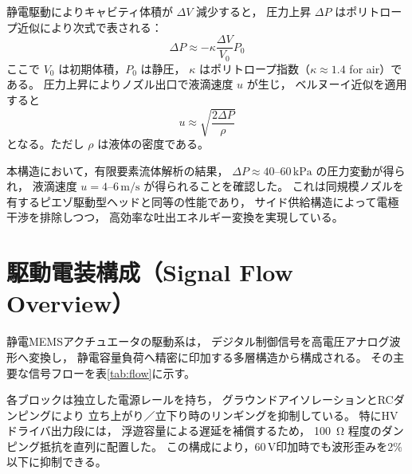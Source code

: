 \documentclass[conference]{IEEEtran}
\begin{document}
静電駆動によりキャビティ体積が $\Delta V$ 減少すると，
圧力上昇 $\Delta P$ はポリトロープ近似により次式で表される：
\[
\Delta P \approx -\kappa \frac{\Delta V}{V_0} P_0
\]
ここで $V_0$ は初期体積，$P_0$ は静圧，
$\kappa$ はポリトロープ指数（$\kappa\!\approx\!1.4$ for air）である。
圧力上昇によりノズル出口で液滴速度 $u$ が生じ，
ベルヌーイ近似を適用すると
\[
u \approx \sqrt{\frac{2\Delta P}{\rho}}
\]
となる。ただし $\rho$ は液体の密度である。

本構造において，有限要素流体解析の結果，
$\Delta P \approx 40$–$60\,\mathrm{kPa}$ の圧力変動が得られ，
液滴速度 $u = 4$–$6\,\mathrm{m/s}$ が得られることを確認した。
これは同規模ノズルを有するピエゾ駆動型ヘッドと同等の性能であり，
サイド供給構造によって電極干渉を排除しつつ，
高効率な吐出エネルギー変換を実現している。

\section{駆動電装構成（Signal Flow Overview）}
静電MEMSアクチュエータの駆動系は，
デジタル制御信号を高電圧アナログ波形へ変換し，
静電容量負荷へ精密に印加する多層構造から構成される。
その主要な信号フローを表\ref{tab:flow}に示す。

\begin{table}[t]
\centering
\caption{静電MEMSアクチュエータの駆動信号フロー構成}
\label{tab:flow}
\end{table}

各ブロックは独立した電源レールを持ち，
グラウンドアイソレーションとRCダンピングにより
立ち上がり／立下り時のリンギングを抑制している。
特にHVドライバ出力段には，
浮遊容量による遅延を補償するため，
\SI{100}{\ohm} 程度のダンピング抵抗を直列に配置した。
この構成により，60\,V印加時でも波形歪みを2\%以下に抑制できる。
\end{document}

